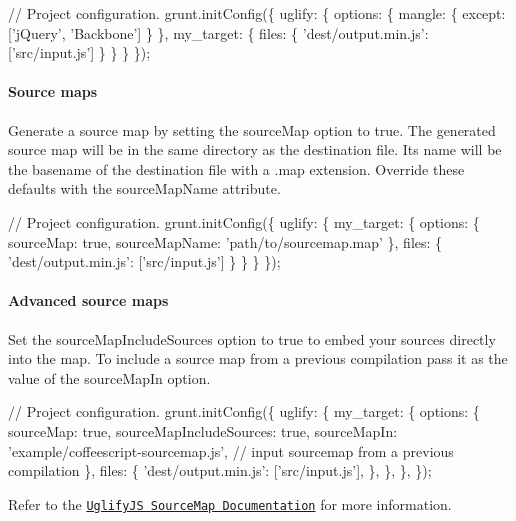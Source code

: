 \begin{DoxyCode}
// Project configuration.
grunt.initConfig(\{
  uglify: \{
    options: \{
      mangle: \{
        except: ['jQuery', 'Backbone']
      \}
    \},
    my\_target: \{
      files: \{
        'dest/output.min.js': ['src/input.js']
      \}
    \}
  \}
\});
\end{DoxyCode}


\paragraph*{Source maps}

Generate a source map by setting the {\ttfamily source\+Map} option to {\ttfamily true}. The generated source map will be in the same directory as the destination file. Its name will be the basename of the destination file with a {\ttfamily .map} extension. Override these defaults with the {\ttfamily source\+Map\+Name} attribute.


\begin{DoxyCode}
// Project configuration.
grunt.initConfig(\{
  uglify: \{
    my\_target: \{
      options: \{
        sourceMap: true,
        sourceMapName: 'path/to/sourcemap.map'
      \},
      files: \{
        'dest/output.min.js': ['src/input.js']
      \}
    \}
  \}
\});
\end{DoxyCode}


\paragraph*{Advanced source maps}

Set the {\ttfamily source\+Map\+Include\+Sources} option to {\ttfamily true} to embed your sources directly into the map. To include a source map from a previous compilation pass it as the value of the {\ttfamily source\+Map\+In} option.


\begin{DoxyCode}
// Project configuration.
grunt.initConfig(\{
  uglify: \{
    my\_target: \{
      options: \{
        sourceMap: true,
        sourceMapIncludeSources: true,
        sourceMapIn: 'example/coffeescript-sourcemap.js', // input sourcemap from a previous compilation
      \},
      files: \{
        'dest/output.min.js': ['src/input.js'],
      \},
    \},
  \},
\});
\end{DoxyCode}


Refer to the \href{http://lisperator.net/uglifyjs/codegen#source-map}{\tt Uglify\+JS Source\+Map Documentation} for more information.


